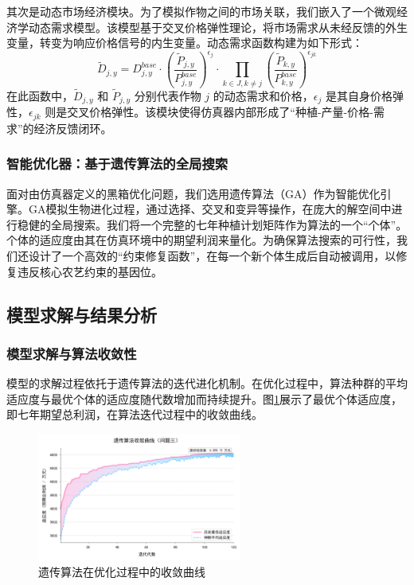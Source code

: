 \documentclass[withoutpreface,bwprint]{cumcmthesis} %
\begin{document}
其次是动态市场经济模块。为了模拟作物之间的市场关联，我们嵌入了一个微观经济学动态需求模型。该模型基于交叉价格弹性理论，将市场需求从未经反馈的外生变量，转变为响应价格信号的内生变量。动态需求函数构建为如下形式：
\begin{equation}
	\tilde{D}_{j,y} = D_{j,y}^{base} \cdot \left(\frac{\tilde{P}_{j,y}}{P_{j,y}^{base}}\right)^{\epsilon_j} \cdot \prod_{k \in J, k \neq j} \left(\frac{\tilde{P}_{k,y}}{P_{k,y}^{base}}\right)^{\epsilon_{jk}}
\end{equation}
在此函数中，$\tilde{D}_{j,y}$ 和 $\tilde{P}_{j,y}$ 分别代表作物 $j$ 的动态需求和价格，$\epsilon_j$ 是其自身价格弹性，$\epsilon_{jk}$ 则是交叉价格弹性。该模块使得仿真器内部形成了“种植-产量-价格-需求”的经济反馈闭环。

\subsubsection{智能优化器：基于遗传算法的全局搜索}

面对由仿真器定义的黑箱优化问题，我们选用遗传算法（GA）作为智能优化引擎。GA模拟生物进化过程，通过选择、交叉和变异等操作，在庞大的解空间中进行稳健的全局搜索。我们将一个完整的七年种植计划矩阵作为算法的一个“个体”。个体的适应度由其在仿真环境中的期望利润来量化。为确保算法搜索的可行性，我们还设计了一个高效的“约束修复函数”，在每一个新个体生成后自动被调用，以修复违反核心农艺约束的基因位。

\subsection{模型求解与结果分析}

\subsubsection{模型求解与算法收敛性}

模型的求解过程依托于遗传算法的迭代进化机制。在优化过程中，算法种群的平均适应度与最优个体的适应度随代数增加而持续提升。图\ref{fig:ga_convergence}展示了最优个体适应度，即七年期望总利润，在算法迭代过程中的收敛曲线。

\begin{figure}[htbp]
	\centering
	\includegraphics[width=0.6\textwidth]{figures/ga_convergence.png}
	\caption{遗传算法在优化过程中的收敛曲线}
	\label{fig:ga_convergence}
\end{figure}
\end{document}
